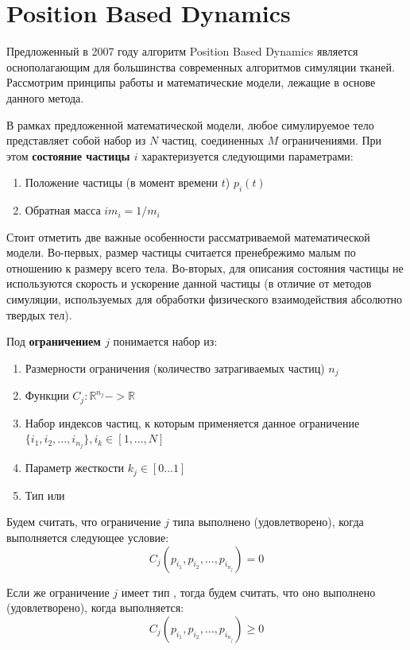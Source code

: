 \section{Position Based Dynamics} \label{ch2:pbd} %
	Предложенный в 2007 году алгоритм Position Based Dynamics\cite{pbd} является оснополагающим для большинства современных алгоритмов симуляции тканей. Рассмотрим принципы работы и математические модели, лежащие в основе данного метода.
	
	В рамках предложенной математической модели, любое симулируемое тело представляет собой набор из $N$ частиц, соединенных $M$ ограничениями. При этом \textbf{состояние частицы $i$} характеризуется следующими параметрами:
	\begin{enumerate}[1.]
		\item Положение частицы (в момент времени $t$) $p_i(t)$
		\item Обратная масса $im_i = 1/m_i$
	\end{enumerate}
	
	Стоит отметить две важные особенности рассматриваемой математической модели. Во-первых, размер частицы считается пренебрежимо малым по отношению к размеру всего тела. Во-вторых, для описания состояния частицы не используются скорость и ускорение данной частицы (в отличие от методов симуляции, используемых для обработки физического взаимодействия абсолютно твердых тел).
	
	Под \textbf{ограничением $j$} понимается набор из:
	\begin{enumerate}[1.]
		\item Размерности ограничения (количество затрагиваемых частиц) $n_j$
		\item Функции $C_j: \mathbb{R}^{n_j}->\mathbb{R}$
		\item Набор индексов частиц, к которым применяется данное ограничение $\{i_1, i_2, ..., i_{n_j}\}, i_k \in [1, ..., N]$
		\item Параметр жесткости $k_j \in [0...1]$
		\item Тип  или 
	\end{enumerate}
	
	Будем считать, что ограничение $j$ типа  выполнено (удовлетворено), когда выполняется следующее условие:
	\begin{equation} \label{eq:constraint-eq}
		C_j(p_{i_1}, p_{i_2}, ..., p_{i_{n_j}}) = 0
	\end{equation} 
	
	Если же ограничение $j$ имеет тип , тогда будем считать, что оно выполнено (удовлетворено), когда выполняется:
	\begin{equation} \label{eq:constraint-neq}
		C_j(p_{i_1}, p_{i_2}, ..., p_{i_{n_j}}) \ge 0
	\end{equation} 
	
